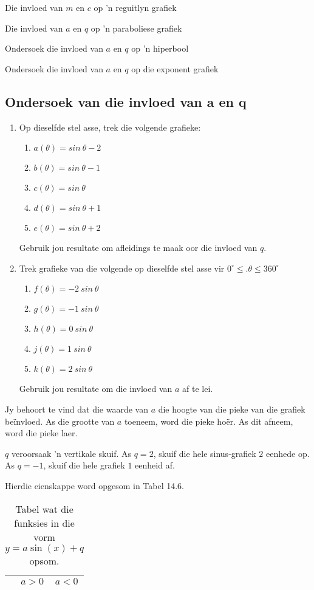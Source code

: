 \begin{Ondersoek}{Die invloed van $m$ en $c$ op 'n reguitlyn grafiek}
\begin{Ondersoek}{Die invloed van $a$ en $q$ op 'n paraboliese grafiek}
\begin{Ondersoek}{Ondersoek die invloed van $a$ en $q$ op 'n hiperbool}
\begin{Ondersoek}{Ondersoek die invloed van $a$ en $q$ op die exponent grafiek}
\subsection*{Ondersoek van die invloed van a en q}
\nopagebreak
\begin{enumerate}[noitemsep, label=\textbf{\arabic*}. ] 
\item Op dieselfde stel asse, trek die volgende grafieke:
\begin{enumerate}[noitemsep, label=\textbf{\alph*}. ] 
\item $a(\theta )=sin~\theta -2$
\item $b(\theta )=sin~\theta -1$
\item $c(\theta )=sin~\theta $
\item $d(\theta )=sin~\theta +1$
\item $e(\theta )=sin~\theta +2$
\end{enumerate}
Gebruik jou resultate om afleidings te maak oor die invloed van $q$.
\item Trek grafieke van die volgende op dieselfde stel asse vir $0^{\circ}\leq. \theta\leq 360^ {\circ}$
\begin{enumerate}[noitemsep, label=\textbf{\alph*}. ] 
\item $f(\theta )=-2~sin~\theta $
\item $g(\theta )=-1~sin~\theta $
\item $h(\theta )=0~sin~\theta $
\item $j(\theta )=1~sin~\theta $
\item $k(\theta )=2~sin~\theta $\end{enumerate}
Gebruik jou resultate om die invloed van $a$ af te lei.
\end{enumerate}
Jy behoort te vind dat die waarde van $a$ die hoogte van die pieke van die grafiek beïnvloed. As die grootte van $a$ toeneem, word die pieke hoër. As dit afneem, word die pieke laer.\par 
$q$ veroorsaak 'n vertikale skuif. As $q=2$, skuif die hele sinus-grafiek $2$ eenhede op. As $q=-1$, skuif die hele grafiek $1$ eenheid af.\par 
Hierdie eienskappe word opgesom in Tabel 14.6.\par 
\begin{table}[htb]
\begin{center}
\caption{Tabel wat die funksies in die vorm $y=a \sin(x) + q$ opsom.}
\label{tab:mt:g:summarysin10}
\begin{tabular}{|c|c|c|}\hline
& $a>0$&$a<0$\\\hline

\end{tabular}
\end{center}
\end{table}
\end{Ondersoek}
\end{Ondersoek}
\end{Ondersoek}
\end{Ondersoek}
